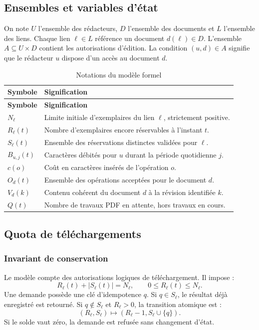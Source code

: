 \subsection{Ensembles et variables d'état}
On note $U$ l'ensemble des rédacteurs, $D$ l'ensemble des documents et $L$ l'ensemble des liens. Chaque lien $\ell\in L$ référence un document $d(\ell)\in D$. L'ensemble $A\subseteq U\times D$ contient les autorisations d'édition. La condition $(u,d)\in A$ signifie que le rédacteur $u$ dispose d'un accès au document $d$.

\begin{longtable}{|P{.22\textwidth}|P{.70\textwidth}|}
\caption{Notations du modèle formel}\label{tab:notations}\\\hline
\textbf{Symbole} & \textbf{Signification} \\\hline
\endfirsthead
\hline\textbf{Symbole} & \textbf{Signification} \\\hline\endhead
\endfoot
$N_\ell$ & Limite initiale d'exemplaires du lien $\ell$, strictement positive. \\\hline
$R_\ell(t)$ & Nombre d'exemplaires encore réservables à l'instant $t$. \\\hline
$S_\ell(t)$ & Ensemble des réservations distinctes validées pour $\ell$. \\\hline
$B_{u,j}(t)$ & Caractères débités pour $u$ durant la période quotidienne $j$. \\\hline
$c(o)$ & Coût en caractères insérés de l'opération $o$. \\\hline
$O_d(t)$ & Ensemble des opérations acceptées pour le document $d$. \\\hline
$V_d(k)$ & Contenu cohérent du document $d$ à la révision identifiée $k$. \\\hline
$Q(t)$ & Nombre de travaux PDF en attente, hors travaux en cours. \\\hline
\end{longtable}

\subsection{Quota de téléchargements}
\subsubsection{Invariant de conservation}
Le modèle compte des autorisations logiques de téléchargement. Il impose :
\begin{equation}
R_\ell(t)+|S_\ell(t)|=N_\ell,\qquad 0\leq R_\ell(t)\leq N_\ell.
\label{eq:quota}
\end{equation}
Une demande possède une clé d'idempotence $q$. Si $q\in S_\ell$, le résultat déjà enregistré est retourné. Si $q\notin S_\ell$ et $R_\ell>0$, la transition atomique est :
\begin{equation}
(R_\ell,S_\ell)\longmapsto (R_\ell-1,S_\ell\cup\{q\}).
\end{equation}
Si le solde vaut zéro, la demande est refusée sans changement d'état.

